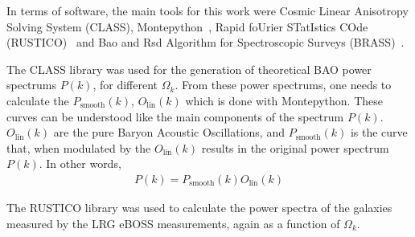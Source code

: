 In terms of software, the main tools for this work were Cosmic Linear Anisotropy Solving System (CLASS)\cite{class}, Montepython~\cite{montepython}, Rapid foUrier STatIstics COde (RUSTICO)~\cite{rustico} and Bao and Rsd Algorithm for Spectroscopic Surveys (BRASS)~\cite{brass}.

The CLASS library was used for the generation of theoretical BAO power spectrums $P(k)$, for different $\Omega_k$. From these power spectrums, one needs to calculate the $P_\text{smooth}(k)$, $O_{\text{lin}}(k)$ which is done with Montepython. These curves can be understood like the main components of the spectrum $P(k)$. $O_{\text{lin}}(k)$ are the pure Baryon Acoustic Oscillations, and $P_{\text{smooth}}(k)$ is the curve that, when modulated by the $O_{\text{lin}}(k)$ results in the original power spectrum $P(k)$. In other words, 
\begin{align}
	P(k) = P_{\text{smooth}}(k) O_{\text{lin}}(k)
\end{align}

The RUSTICO library was used to calculate the power spectra of the galaxies measured by the LRG eBOSS measurements, again as a function of $\Omega_k$.

